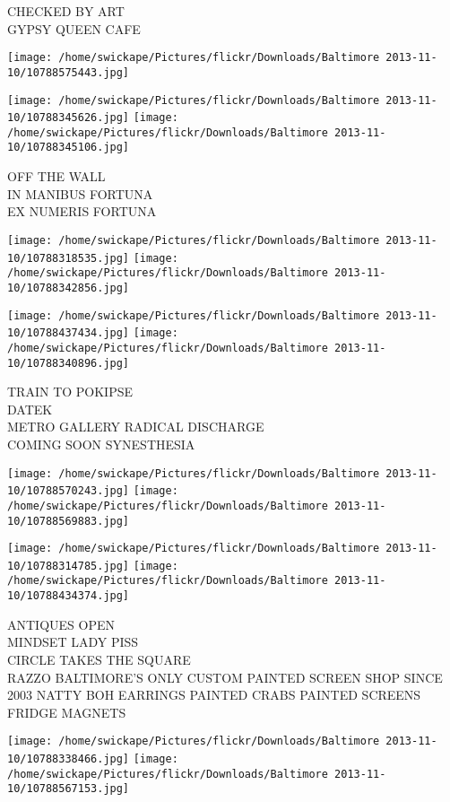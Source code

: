 \documentclass[10pt,letterpaper]{article}
\begin{document}
CHECKED BY ART\\
GYPSY QUEEN CAFE
\pagebreak

\texttt{[image: /home/swickape/Pictures/flickr/Downloads/Baltimore 2013-11-10/10788575443.jpg]}

\vspace{0.25in}
\texttt{[image: /home/swickape/Pictures/flickr/Downloads/Baltimore 2013-11-10/10788345626.jpg]}
\texttt{[image: /home/swickape/Pictures/flickr/Downloads/Baltimore 2013-11-10/10788345106.jpg]}

OFF THE WALL\\
IN MANIBUS FORTUNA\\
EX NUMERIS FORTUNA
\pagebreak

\texttt{[image: /home/swickape/Pictures/flickr/Downloads/Baltimore 2013-11-10/10788318535.jpg]}
\texttt{[image: /home/swickape/Pictures/flickr/Downloads/Baltimore 2013-11-10/10788342856.jpg]}

\texttt{[image: /home/swickape/Pictures/flickr/Downloads/Baltimore 2013-11-10/10788437434.jpg]}
\texttt{[image: /home/swickape/Pictures/flickr/Downloads/Baltimore 2013-11-10/10788340896.jpg]}

TRAIN TO POKIPSE\\
DATEK\\
METRO GALLERY RADICAL DISCHARGE\\
COMING SOON SYNESTHESIA
\pagebreak

\texttt{[image: /home/swickape/Pictures/flickr/Downloads/Baltimore 2013-11-10/10788570243.jpg]}
\texttt{[image: /home/swickape/Pictures/flickr/Downloads/Baltimore 2013-11-10/10788569883.jpg]}

\texttt{[image: /home/swickape/Pictures/flickr/Downloads/Baltimore 2013-11-10/10788314785.jpg]}
\texttt{[image: /home/swickape/Pictures/flickr/Downloads/Baltimore 2013-11-10/10788434374.jpg]}

ANTIQUES OPEN\\
MINDSET LADY PISS\\
CIRCLE TAKES THE SQUARE\\
RAZZO BALTIMORE'S ONLY CUSTOM PAINTED SCREEN SHOP SINCE 2003 NATTY BOH EARRINGS PAINTED CRABS PAINTED SCREENS FRIDGE MAGNETS
\pagebreak

\texttt{[image: /home/swickape/Pictures/flickr/Downloads/Baltimore 2013-11-10/10788338466.jpg]}
\texttt{[image: /home/swickape/Pictures/flickr/Downloads/Baltimore 2013-11-10/10788567153.jpg]}
\end{document}
